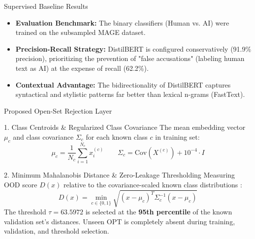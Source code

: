 \documentclass[aspectratio=169]{beamer}
\begin{document}
\begin{frame}{Supervised Baseline Results}
\begin{itemize}
    \item \textbf{Evaluation Benchmark:} The binary classifiers (Human vs. AI) were trained on the subsampled MAGE dataset.
\end{itemize}
\centering
{}
\begin{itemize}
    \item \textbf{Precision-Recall Strategy:} DistilBERT is configured conservatively (91.9\% precision), prioritizing the prevention of "false accusations" (labeling human text as AI) at the expense of recall (62.2\%).
    \item \textbf{Contextual Advantage:} The bidirectionality of DistilBERT captures syntactical and stylistic patterns far better than lexical n-grams (FastText).
\end{itemize}
\end{frame}

\begin{frame}{Proposed Open-Set Rejection Layer}
\begin{block}{1. Class Centroids & Regularized Class Covariance}
The mean embedding vector $\mu_c$ and class covariance $\Sigma_c$ for each known class $c$ in training set:
$$\mu_c = \frac{1}{N_c} \sum_{i=1}^{N_c} x_i^{(c)} \qquad \Sigma_c = \text{Cov}(X^{(c)}) + 10^{-4} \cdot I$$
\end{block}
\begin{block}{2. Minimum Mahalanobis Distance & Zero-Leakage Thresholding}
Measuring OOD score $D(x)$ relative to the covariance-scaled known class distributions \cite{mahalanobis1936generalized}:
$$D(x) = \min_{c \in \{0, 1\}} \sqrt{(x - \mu_c)^T \Sigma_c^{-1} (x - \mu_c)}$$
The threshold $\tau = 63.5972$ is selected at the \textbf{95th percentile} of the known validation set's distances. Unseen OPT is completely absent during training, validation, and threshold selection.
\end{block}
\end{frame}
\end{document}
